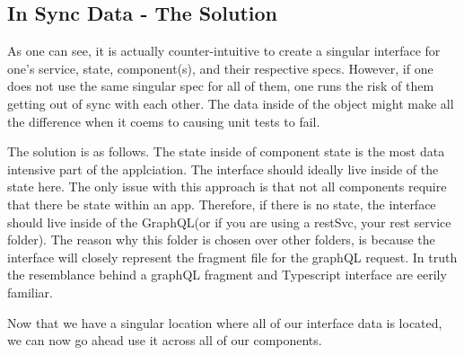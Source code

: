 \subsection{ In Sync Data - The Solution }
As one can see, it is actually counter-intuitive to create a singular interface
for one's service, state, component(s), and their respective specs. However, if
one does not use the same singular spec for all of them, one runs the risk of
them getting out of sync with each other. The data inside of the object might
make all the difference when it coems to causing unit tests to fail.

The solution is as follows. The state inside of component state is the most
data intensive part of the applciation. The interface should ideally live inside
of the state here. The only issue with this approach is that not all components
require that there be state within an app. Therefore, if there is no state,
the interface should live inside of the GraphQL(or if you are using a restSvc,
your rest service folder). The reason why this folder is chosen over other
folders, is because the interface will closely represent the fragment file for
the graphQL request. In  truth the resemblance behind a graphQL fragment and
Typescript interface are eerily familiar.

Now that we have a singular location where all of our interface data is
located, we can now go ahead use it across all of our components.
